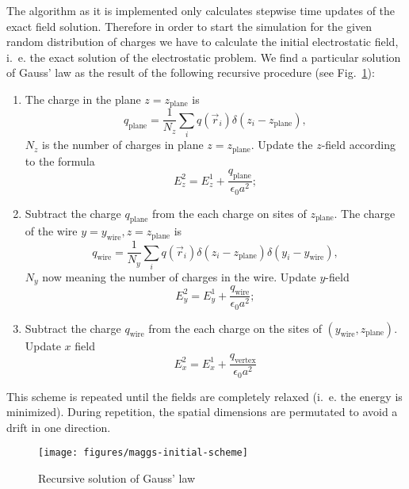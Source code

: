 The algorithm as it is implemented only calculates stepwise time
updates of the exact field solution. Therefore in order to start the
simulation for the given random distribution of charges we have to
calculate the initial electrostatic field, i.~e. the exact solution of
the electrostatic problem. We find a particular solution of Gauss' law
as the result of the following recursive procedure (see
Fig.~\ref{fig:maggs-initialization}):

\begin{enumerate}
\item The charge in the plane $z=z_\text{plane}$ is
\begin{equation}
  q_\text{plane}=\frac{1}{N_z}\sum_iq(\vec r_i)\delta(z_i-z_\text{plane}),
\end{equation}
$N_z$ is the number of charges in plane $z=z_\text{plane}$. Update the
$z$-field according to the formula
\begin{equation}
  E_z^2=E_z^1+\frac{q_\text{plane}}{\epsilon_0a^2};
\end{equation}
\item Subtract the charge $q_\text{plane}$ from the each charge on
  sites of $z_\text{plane}$. The charge of the wire $y=y_\text{wire},
  z=z_\text{plane}$ is
\begin{equation}
  q_\text{wire}=\frac{1}{N_y}\sum_iq(\vec r_i)\delta(z_i-z_\text{plane})\delta(y_i-y_\text{wire}),
\end{equation}
$N_y$ now meaning the number of charges in the wire. Update $y$-field
\begin{equation}
  E_y^2=E_y^1+\frac{q_\text{wire}}{\epsilon_0a^2};
\end{equation}
\item Subtract the charge $q_\text{wire}$ from the each charge on the
  sites of $(y_\text{wire},z_\text{plane})$. Update $x$ field
\begin{equation}
  E_x^2=E_x^1+\frac{q_\text{vertex}}{\epsilon_0a^2}
\end{equation}
\end{enumerate}

This scheme is repeated until the fields are completely relaxed
(i.~e. the energy is minimized). During repetition, the spatial
dimensions are permutated to avoid a drift in one direction.

\begin{figure}[ht]
  \centering \texttt{[image: figures/maggs-initial-scheme]}
  \caption{Recursive solution of Gauss' law}
  \label{fig:maggs-initialization}
\end{figure} 

